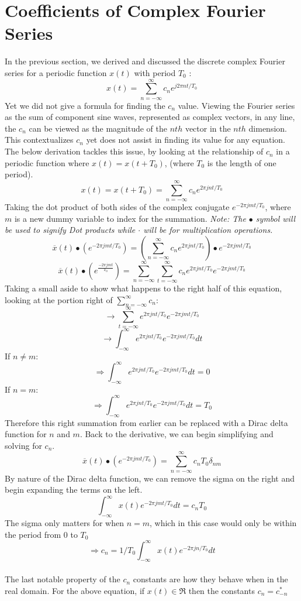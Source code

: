 \documentclass[12pt]{article}
\begin{document}
\section{Coefficients of Complex Fourier Series}
In the previous section, we derived and discussed the discrete complex Fourier series for a periodic function $x(t)$ with period $T_0$ : $$x(t) = \sum_{n = -\infty}^{\infty} c_n e^{j2\pi nt/T_0} $$ Yet we did not give a formula for finding the $c_n$ value. Viewing the Fourier series as the sum of component sine waves, represented as complex vectors, in any line, the $c_n$ can be viewed as the magnitude of the $nth$ vector in the $nth$ dimension. This contextualizes $c_n$ yet does not assist in finding its value for any equation. The below derivation tackles this issue, by looking at the relationship of $c_n$ in a periodic function where $x(t) = x(t+T_0)$, (where $T_0$ is the length of one period). 
$$ x(t) = x(t+T_0) = \sum_{n=-\infty}^{\infty} c_n e^{2\pi jnt/T_0} $$ Taking the dot product of both sides of the complex conjugate $e^{-2\pi jmt/T_0} $, where $m$ is a new dummy variable to index for the summation. \textit{Note: The $\bullet$ symbol will be used to signify Dot products while $\cdot$ will be for multiplication operations. } $$ \overline{x}(t) \bullet ( e^{-2\pi jmt/T_0}) = (\sum_{n=-\infty}^{\infty} c_n e^{2\pi jnt/T_0}) \bullet e^{-2\pi jmt/T_0} $$ 
$$\overline{x}(t) \bullet (e^{\frac{-2\pi jmt}{T_0}})  = \sum_{n=-\infty}^{\infty} \sum_{t=-\infty}^{\infty} c_n e^{2\pi jnt/T_0} e^{-2\pi jmt/T_0} $$ Taking a small aside to show what happens to the right half of this equation, looking at the portion right of $\sum\limits_{n=-\infty}^{\infty} c_n $: 
$$\rightarrow \sum_{t=-\infty}^{\infty} e^{2\pi jnt/T_0} e^{-2\pi jmt/T_0} $$
 $$\rightarrow \int_{-\infty}^{\infty} e^{2\pi jnt/T_0} e^{-2\pi jmt/T_0} dt $$ If $n \neq m$: $$ \Rightarrow \int_{-\infty}^{\infty} e^{2\pi jnt/T_0} e^{-2\pi jmt/T_0} dt = 0 $$ If $n = m$: $$\Rightarrow \int_{-\infty}^{\infty} e^{2\pi jnt/T_0} e^{-2\pi jmt/T_0} dt = T_0$$ Therefore this right summation from earlier can be replaced with a Dirac delta function for $n$ and $m$. Back to the derivative, we can begin simplifying and solving for $c_n$. $$ \overline{x}(t) \bullet (e^{-2\pi jmt/T_0})  = \sum_{n=-\infty}^{\infty} c_n T_0 \delta_{nm} $$ By nature of the Dirac delta function, we can remove the sigma on the right and begin expanding the terms on the left. $$\int_{-\infty}^{\infty} x(t)e^{-2\pi jmt/T_0}dt = c_n T_0 $$ The sigma only matters for when $n=m$, which in this case would only be within the period from 0 to $T_0$ $$\Rightarrow c_n = 1/T_0  \int_{-\infty}^{\infty} x(t)e^{-2\pi jn/T_0} dt$$ %
\\
The last notable property of the $c_n$ constants are how they behave when in the real domain. For the above equation, if $x(t) \in \Re$ then the constants $c_n = c_{-n}^* $
\end{document}
